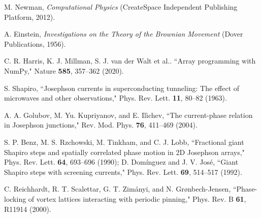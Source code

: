 \documentclass[preprint,showpacs,preprintnumbers,amsmath,amssymb,aps,prb]{revtex4-1}
\theoremstyle{remark}
\begin{document}
\begin{thebibliography}{99}
   M. Newman, {\it Computational Physics} (CreateSpace Independent Publishing Platform, 2012).
      
   A. Einstein, {\it Investigations on the Theory of the Brownian Movement}  (Dover Publications, 1956).

     C. R. Harris, K. J. Millman, S. J. van der Walt et al.. ``Array programming with NumPy,"  Nature {\bf 585}, 357--362 (2020). %
      
     S. Shapiro, ``Josephson currents in superconducting tunneling: The effect of microwaves and other observations," Phys. Rev. Lett. {\bf 11}, 80--82 (1963).

     A. A. Golubov, M. Yu. Kupriyanov, and E. Il{\`i}chev, ``The current-phase relation in Josephson junctions," Rev. Mod. Phys. {\bf 76}, 411--469 (2004).

      S. P. Benz, M. S. Rzchowski, M. Tinkham, and C. J. Lobb, ``Fractional giant Shapiro steps and spatially correlated phase motion in 2D Josephson arrays," Phys. Rev. Lett. {\bf 64}, 693--696 (1990); D. Dom{\'i}nguez and J. V. Jos{\'e}, ``Giant Shapiro steps with screening currents," Phys. Rev. Lett. {\bf 69}, 514--517 (1992).

     C. Reichhardt, R. T. Scalettar, G. T. Zim{\'a}nyi, and N. Gr{\o}nbech-Jensen,  ``Phase-locking of vortex lattices interacting with periodic pinning,"  Phys. Rev. B {\bf 61}, R11914 (2000).
     

\end{thebibliography}
\end{document}

